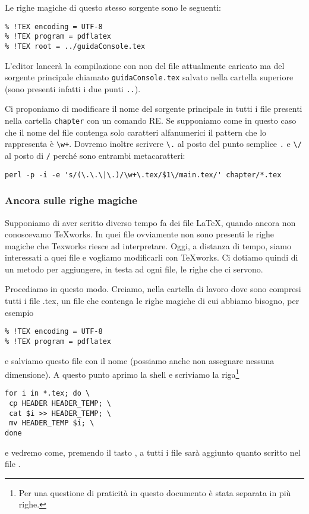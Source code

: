 Le righe magiche di questo stesso sorgente sono le seguenti:
\begin{verbatim}
% !TEX encoding = UTF-8
% !TEX program = pdflatex
% !TEX root = ../guidaConsole.tex
\end{verbatim}
L'editor lancerà la compilazione con  non del file attualmente caricato ma del sorgente principale chiamato \texttt{guidaConsole.tex} salvato nella cartella superiore (sono presenti infatti i due punti \texttt{..}).

Ci proponiamo di modificare il nome del sorgente principale in tutti i file presenti nella cartella \texttt{chapter} con un comando RE. Se supponiamo come in questo caso che il nome del file contenga solo caratteri alfanumerici il pattern che lo rappresenta è \texttt{\textbackslash w+}. Dovremo inoltre scrivere \texttt{\textbackslash .} al posto del punto semplice \texttt{.} e \texttt{\textbackslash /} al posto di \texttt{/} perché sono entrambi metacaratteri: 
\begin{Verbatim}[fontsize=\small]
perl -p -i -e 's/(\.\.\|\.)/\w+\.tex/$1\/main.tex/' chapter/*.tex
\end{Verbatim}

\subsubsection{Ancora sulle righe magiche}
\label{sssec:addheader}

Supponiamo di aver scritto diverso tempo fa dei file \LaTeX, quando ancora non conoscevamo \TeX works. In quei file ovviamente non sono
presenti le righe magiche che Texworks riesce ad
interpretare. Oggi, a distanza di tempo, siamo interessati a quei
file e vogliamo modificarli con \TeX works. Ci dotiamo quindi di un
metodo per aggiungere, in testa ad ogni file, le righe che ci servono.

Procediamo in questo modo. Creiamo, nella cartella di lavoro dove sono
compresi tutti i file .tex, un file che
contenga le righe magiche di cui abbiamo bisogno, per esempio
\begin{Verbatim}
% !TEX encoding = UTF-8
% !TEX program = pdflatex
\end{Verbatim}
e salviamo questo file con il nome  (possiamo anche non assegnare nessuna dimensione). A questo punto aprimo la shell e scriviamo la riga\footnote{Per una questione di praticità in questo documento è stata separata in più righe.}
\begin{Verbatim}
for i in *.tex; do \
 cp HEADER HEADER_TEMP; \
 cat $i >> HEADER_TEMP; \
 mv HEADER_TEMP $i; \
done
\end{Verbatim}
e vedremo come, premendo il tasto \keys{\return}, a tutti i file sarà aggiunto quanto scritto nel file . 

